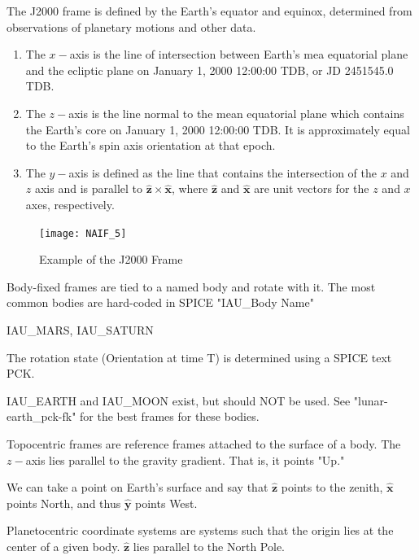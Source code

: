 \documentclass[crop=false,class=book]{standalone}
\begin{document}
\begin{definition}
The J2000 frame is defined by the Earth's equator and equinox, determined from observations of planetary motions and other data. 
\begin{enumerate}
    \item The $x-$axis is the line of intersection between Earth's mea equatorial plane and the ecliptic plane on January 1, 2000 12:00:00 TDB, or JD 2451545.0 TDB.
    \item The $z-$axis is the line normal to the mean equatorial plane which contains the Earth's core on January 1, 2000 12:00:00 TDB. It is approximately equal to the Earth's spin axis orientation at that epoch.
    \item The $y-$axis is defined as the line that contains the intersection of the $x$ and $z$ axis and is parallel to $\hat{\mathbf{z}}\times \hat{\mathbf{x}}$, where $\hat{\mathbf{z}}$ and $\hat{\mathbf{x}}$ are unit vectors for the $z$ and $x$ axes, respectively.
\end{enumerate}
\end{definition}
\begin{figure}
    \centering
    \texttt{[image: NAIF\_5]}
    \caption{Example of the J2000 Frame}
    \label{fig:naif_j200_figure}
\end{figure}
Body-fixed frames are tied to a named body and rotate with it. The most common bodies are hard-coded in SPICE "IAU\_Body Name"
\begin{example}
IAU\_MARS, IAU\_SATURN
\end{example}
The rotation state (Orientation at time T) is determined using a SPICE text PCK. 
\begin{remark}
IAU\_EARTH and IAU\_MOON exist, but should NOT be used. See "lunar-earth\_pck-fk" for the best frames for these bodies.
\end{remark}
\begin{definition}
Topocentric frames are reference frames attached to the surface of a body. The $z-$axis lies parallel to the gravity gradient. That is, it points "Up."
\end{definition}
\begin{example}
We can take a point on Earth's surface and say that $\hat{\mathbf{z}}$ points to the zenith, $\hat{\mathbf{x}}$ points North, and thus $\hat{\mathbf{y}}$ points West.
\end{example}
\begin{definition}
Planetocentric coordinate systems are systems such that the origin lies at the center of a given body. $\hat{\mathbf{z}}$ lies parallel to the North Pole.
\end{definition}
\end{document}
